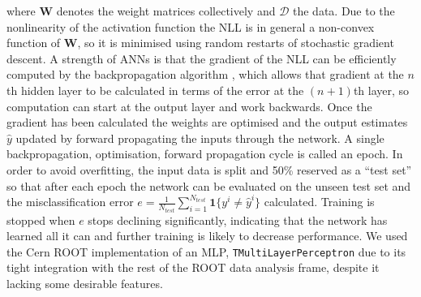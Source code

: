 where \textbf{W} denotes the weight matrices collectively and $\mathcal{D}$ the data.
Due to the nonlinearity of the activation function the NLL is in general a non-convex function of \textbf{W}, so it is minimised using random restarts of stochastic gradient descent. 
A strength of ANNs is that the gradient of the NLL can be efficiently computed by the backpropagation algorithm \cite{murphy2012machine}, which allows that gradient at the $n$th hidden layer to be calculated in terms of the error at the $(n+1)$th layer, so computation can start at the output layer and work backwards.
Once the gradient has been calculated the weights are optimised and the output estimates $\hat{y}$ updated by forward propagating the inputs through the network. A single backpropagation, optimisation, forward propagation cycle is called an epoch.
In order to avoid overfitting, the input data is split and 50\% reserved as a ``test set'' so that after each epoch the network can be evaluated on the unseen test set and the misclassification error 
$e = \frac{1}{N_{test}}\sum_{i = 1}^{N_{test}} \mathbf{1}\{y^i \ne \hat{y}^i \} $
calculated. Training is stopped when $e$ stops declining significantly, indicating that the network has learned all it can and further training is likely to decrease performance. 
We used the Cern ROOT \cite{citeulike:363715} implementation of an MLP, \texttt{TMultiLayerPerceptron} due to its tight integration with the rest of the ROOT data analysis frame, despite it lacking some desirable features.
